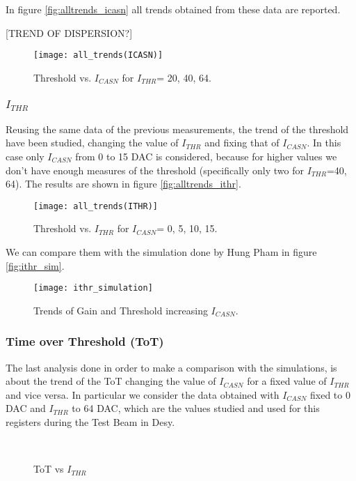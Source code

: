 In figure \vref{fig:alltrends_icasn} all trends obtained from these data are reported.

[TREND OF DISPERSION?]

\begin{figure}[h!]
\centering
\texttt{[image: all\_trends(ICASN)]}
\caption{Threshold vs. $I_{CASN}$ for $I_{THR}$= 20, 40, 64.}
\label{fig:alltrends_icasn}
\end{figure}

\subsubsection{$I_{THR}$}

Reusing the same data of the previous measurements, the trend of the threshold have been studied, changing the value of $I_{THR}$ and fixing that of $I_{CASN}$. In this case only $I_{CASN}$ from 0 to 15 DAC is considered, because for higher values we don't have enough measures of the threshold (specifically only two for $I_{THR}$=40, 64). The results are shown in figure \vref{fig:alltrends_ithr}.

\begin{figure}[h!]
\centering
\texttt{[image: all\_trends(ITHR)]}
\caption{Threshold vs. $I_{THR}$ for $I_{CASN}$= 0, 5, 10, 15.}
\label{fig:alltrends_ithr}
\end{figure}

We can compare them with the simulation done by Hung Pham in figure \vref{fig:ithr_sim}. 

\begin{figure}[h!]
\centering
\texttt{[image: ithr\_simulation]}
\caption{Trends of Gain and Threshold increasing $I_{CASN}$.}
\label{fig:ithr_sim}
\end{figure}



\subsubsection{Time over Threshold (ToT)}

The last analysis done in order to make a comparison with the simulations, is about the trend of the ToT changing the value of $I_{CASN}$ for a fixed value of $I_{THR}$ and vice versa. In particular we consider the data obtained with $I_{CASN}$ fixed to 0 DAC and $I_{THR}$ to 64 DAC, which are the values studied and used for this registers during the Test Beam in Desy.

\begin{figure}[h!]
\centering
{}\quad
{}\\
\caption{ToT vs $I_{THR}$}
\label{fig:tot_vs_ithr}
\end{figure}

